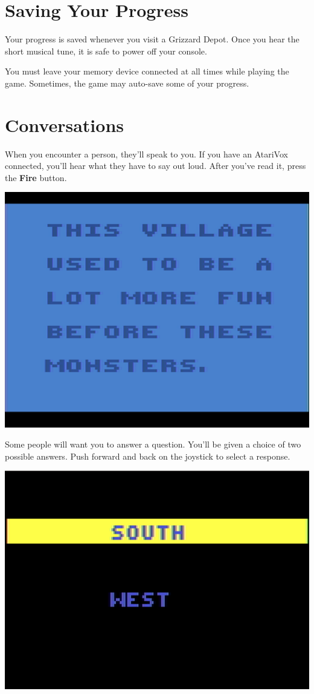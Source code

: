 \documentclass[9pt,twocolumn,openany,article]{memoir}
\begin{document}
\ifdefined\NOSAVE\else

\section{Saving Your Progress}

Your progress  is saved whenever  you visit  a Grizzard Depot.  Once you
hear the short musical tune, it is safe to power off your console.

\ifdefined\ATARIAGESAVE\else

You must leave  your memory device connected at all  times while playing
the game. Sometimes, the game may auto-save some of your progress.

\fi \fi

\section{Conversations}

When  you encounter  a person,  they'll  speak to  you. If  you have  an
AtariVox  connected,  you'll  hear  what  they have  to  say  out  loud.
After you've read it, press the \textbf{Fire} button.

\begin{center}
  \includegraphics[width=.75\columnwidth]{../Manual/TextNTSC.png}
\end{center}

Some people will want you to answer a question. You'll be given a choice
of two possible answers. Push forward and back on the joystick to select
a response.

\begin{center}
  \includegraphics[width=.75\columnwidth]{../Manual/InquireNTSC.png}
\end{center}
\end{document}
